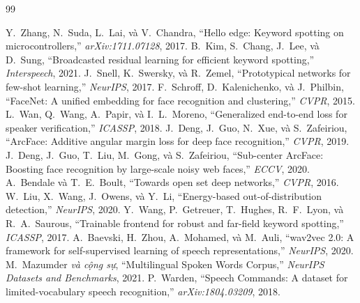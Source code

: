 \documentclass[12pt,a4paper]{report}
\begin{document}
\begin{thebibliography}{99}
\footnotesize

 Y.~Zhang, N.~Suda, L.~Lai, và V.~Chandra,
``Hello edge: Keyword spotting on microcontrollers,'' \emph{arXiv:1711.07128}, 2017.
 B.~Kim, S.~Chang, J.~Lee, và D.~Sung,
``Broadcasted residual learning for efficient keyword spotting,'' \emph{Interspeech}, 2021.
 J.~Snell, K.~Swersky, và R.~Zemel,
``Prototypical networks for few-shot learning,'' \emph{NeurIPS}, 2017.
 F.~Schroff, D.~Kalenichenko, và J.~Philbin,
``FaceNet: A unified embedding for face recognition and clustering,'' \emph{CVPR}, 2015.
 L.~Wan, Q.~Wang, A.~Papir, và I.~L.~Moreno,
``Generalized end-to-end loss for speaker verification,'' \emph{ICASSP}, 2018.
 J.~Deng, J.~Guo, N.~Xue, và S.~Zafeiriou,
``ArcFace: Additive angular margin loss for deep face recognition,'' \emph{CVPR}, 2019.
 J.~Deng, J.~Guo, T.~Liu, M.~Gong, và S.~Zafeiriou,
``Sub-center ArcFace: Boosting face recognition by large-scale noisy web faces,'' \emph{ECCV}, 2020.
 A.~Bendale và T.~E.~Boult,
``Towards open set deep networks,'' \emph{CVPR}, 2016.
 W.~Liu, X.~Wang, J.~Owens, và Y.~Li,
``Energy-based out-of-distribution detection,'' \emph{NeurIPS}, 2020.
 Y.~Wang, P.~Getreuer, T.~Hughes, R.~F.~Lyon, và R.~A.~Saurous,
``Trainable frontend for robust and far-field keyword spotting,'' \emph{ICASSP}, 2017.
 A.~Baevski, H.~Zhou, A.~Mohamed, và M.~Auli,
``wav2vec 2.0: A framework for self-supervised learning of speech representations,'' \emph{NeurIPS}, 2020.
 M.~Mazumder \emph{và cộng sự},
``Multilingual Spoken Words Corpus,'' \emph{NeurIPS Datasets and Benchmarks}, 2021.
 P.~Warden,
``Speech Commands: A dataset for limited-vocabulary speech recognition,'' \emph{arXiv:1804.03209}, 2018.

\end{thebibliography}
\end{document}
